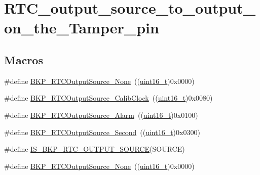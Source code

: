 \hypertarget{group___r_t_c__output__source__to__output__on__the___tamper__pin}{}\section{R\+T\+C\+\_\+output\+\_\+source\+\_\+to\+\_\+output\+\_\+on\+\_\+the\+\_\+\+Tamper\+\_\+pin}
\label{group___r_t_c__output__source__to__output__on__the___tamper__pin}
\subsection*{Macros}
\begin{DoxyCompactItemize}
\item 
\#define \hyperlink{group___r_t_c__output__source__to__output__on__the___tamper__pin_ga8a18950396b2db70311480ab76464c6e}{B\+K\+P\+\_\+\+R\+T\+C\+Output\+Source\+\_\+\+None}~((\hyperlink{_p_e___types_8h_a1f1825b69244eb3ad2c7165ddc99c956}{uint16\+\_\+t})0x0000)
\item 
\#define \hyperlink{group___r_t_c__output__source__to__output__on__the___tamper__pin_ga6fd7cb80bb52bca65641cbe6aa2c4590}{B\+K\+P\+\_\+\+R\+T\+C\+Output\+Source\+\_\+\+Calib\+Clock}~((\hyperlink{_p_e___types_8h_a1f1825b69244eb3ad2c7165ddc99c956}{uint16\+\_\+t})0x0080)
\item 
\#define \hyperlink{group___r_t_c__output__source__to__output__on__the___tamper__pin_gac016224386421d0cb1c0cd0ee201d65a}{B\+K\+P\+\_\+\+R\+T\+C\+Output\+Source\+\_\+\+Alarm}~((\hyperlink{_p_e___types_8h_a1f1825b69244eb3ad2c7165ddc99c956}{uint16\+\_\+t})0x0100)
\item 
\#define \hyperlink{group___r_t_c__output__source__to__output__on__the___tamper__pin_ga23cb72635820331317ee4ee5a7897a70}{B\+K\+P\+\_\+\+R\+T\+C\+Output\+Source\+\_\+\+Second}~((\hyperlink{_p_e___types_8h_a1f1825b69244eb3ad2c7165ddc99c956}{uint16\+\_\+t})0x0300)
\item 
\#define \hyperlink{group___r_t_c__output__source__to__output__on__the___tamper__pin_gac59454ee255feb55b5e14c34b70c99da}{I\+S\+\_\+\+B\+K\+P\+\_\+\+R\+T\+C\+\_\+\+O\+U\+T\+P\+U\+T\+\_\+\+S\+O\+U\+R\+CE}(S\+O\+U\+R\+CE)
\item 
\#define \hyperlink{group___r_t_c__output__source__to__output__on__the___tamper__pin_ga8a18950396b2db70311480ab76464c6e}{B\+K\+P\+\_\+\+R\+T\+C\+Output\+Source\+\_\+\+None}~((\hyperlink{_p_e___types_8h_a1f1825b69244eb3ad2c7165ddc99c956}{uint16\+\_\+t})0x0000)

\end{DoxyCompactItemize}
